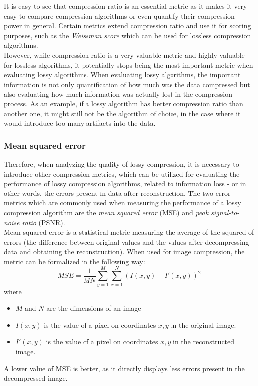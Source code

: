 \documentclass[thesis=M,english]{FITthesis}[2012/10/20]
\begin{document}
It is easy to see that compression ratio is an essential metric as
it makes it very easy to compare compression algorithms or even
quantify their compression power in general. Certain metrics
extend compression ratio and use it for scoring purposes, such as
the \emph{Weissman score} which can be used for lossless compression
algorithms.
\\

However, while compression ratio is a very valuable metric and
highly valuable for lossless algorithms, it potentially stops
being the most important metric when evaluating lossy algorithms.
When evaluating lossy algorithms, the important information is not
only quantification of how much was the data compressed but also
evaluating how much information was actually lost in the compression
process. As an example, if a lossy algorithm has better compression
ratio than another one, it might still not be the algorithm of choice,
in the case where it would introduce too many artifacts into the data.

\subsubsection{Mean squared error}
Therefore, when analyzing the quality of lossy compression,
it is necessary to introduce other compression metrics, which
can be utilized for evaluating the performance of lossy compression
algorithms, related to information loss - or in other words, the errors
present in data after reconstruction. The two error metrics which are
commonly used when measuring the performance of a lossy compression
algorithm are the \emph{mean squared error} (MSE) and \emph{peak
signal-to-noise ratio} (PSNR).\cite{imgcompintro}
\\

Mean squared error is a statistical metric measuring the average
of the squared of errors (the difference between original values and
the values after decompressing data and obtaining the reconstruction).
When used for image compression, the metric can be formalized in the
following way:
\begin{equation}
    MSE = \frac{1}{MN}\sum_{y=1}^{M}\sum_{x=1}^{N}(I(x,y) - I'(x,y))^2
\end{equation}
where
\begin{itemize}
    \item $M$ and $N$ are the dimensions of an image
    \item $I(x, y)$ is the value of a pixel on coordinates $x, y$ in the
    original image.
    \item $I'(x, y)$ is the value of a pixel on coordinates $x, y$ in the
    reconstructed image.
\end{itemize}
A lower value of MSE is better, as it directly displays less errors present
in the decompressed image.
\\
\end{document}
